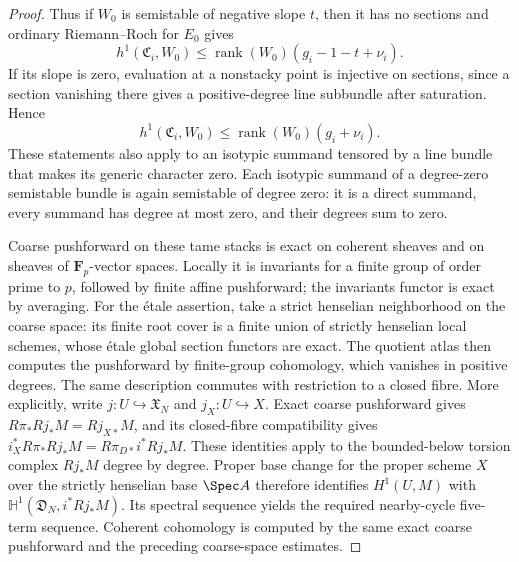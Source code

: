 \begin{proof}
Thus if $W_0$ is semistable of negative slope $t$, then it has no
sections and ordinary Riemann--Roch for $E_0$ gives
\[
 h^1(\mathfrak C_i,W_0)
 \leq \operatorname{rank}(W_0)(g_i-1-t+\nu_i).
 \tag{F8.4}
\]
If its slope is zero, evaluation at a nonstacky point is injective
on sections, since a section vanishing there gives a positive-degree
line subbundle after saturation. Hence
\[
 h^1(\mathfrak C_i,W_0)
 \leq \operatorname{rank}(W_0)(g_i+\nu_i).
 \tag{F8.5}
\]
These statements also apply to an isotypic summand tensored by a
line bundle that makes its generic character zero. Each isotypic
summand of a degree-zero semistable bundle is again semistable of
degree zero: it is a direct summand, every summand has degree at
most zero, and their degrees sum to zero.

Coarse pushforward on these tame stacks is exact on coherent
sheaves and on sheaves of $\mathbf F_p$-vector spaces. Locally it
is invariants for a finite group of order prime to $p$, followed
by finite affine pushforward; the invariants functor is exact by
averaging. For the \'etale assertion, take a strict henselian
neighborhood on the coarse space: its finite root cover is a finite
union of strictly henselian local schemes, whose \'etale global
section functors are exact. The quotient atlas then computes the
pushforward by finite-group cohomology, which vanishes in positive
degrees. The same description commutes with restriction to a closed
fibre. More explicitly, write $j:U\hookrightarrow\mathfrak X_N$ and
$j_X:U\hookrightarrow X$. Exact coarse pushforward gives
$R\pi_*Rj_*M=Rj_{X*}M$, and its closed-fibre compatibility gives
$i_X^*R\pi_*Rj_*M=R\pi_{D*}i^*Rj_*M$. These identities apply
to the bounded-below torsion complex $Rj_*M$ degree by degree.
Proper base change for the proper scheme $X$ over the strictly
henselian base $\Spec A$ therefore identifies
$H^1(U,M)$ with $\mathbb H^1(\mathfrak D_N,i^*Rj_*M)$.
Its spectral sequence yields the required nearby-cycle five-term
sequence. Coherent cohomology is computed by the same exact
coarse pushforward and the preceding coarse-space estimates.


\end{proof}

